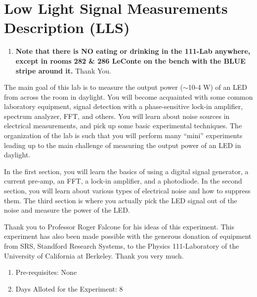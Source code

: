 \documentclass{../lab}
\begin{document}
\maketitle

\tableofcontents

\section{Low Light Signal Measurements Description (LLS)}

\begin{enumerate}
    \item \textbf{Note that there is NO eating or drinking in the 111-Lab anywhere, except in rooms 282 \& 286 LeConte on the bench with the BLUE stripe around it.} Thank You.

\end{enumerate}

The main goal of this lab is to measure the output power ($\sim$10-4 W) of an LED from across the room in daylight. You will become acquainted with some common laboratory equipment, signal detection with a phase-sensitive lock-in amplifier, spectrum analyzer, FFT, and others. You will learn about noise sources in electrical measurements, and pick up some basic experimental techniques. The organization of the lab is such that you will perform many ``mini'' experiments leading up to the main challenge of measuring the output power of an LED in daylight.

In the first section, you will learn the basics of using a digital signal generator, a current pre-amp, an FFT, a lock-in amplifier, and a photodiode. In the second section, you will learn about various types of electrical noise and how to suppress them. The third section is where you actually pick the LED signal out of the noise and measure the power of the LED.

Thank you to Professor Roger Falcone for his ideas of this experiment. This experiment has also been made possible with the generous donation of equipment from SRS, Standford Research Systems, to the Physics 111-Laboratory of the University of California at Berkeley. Thank you very much.

\begin{enumerate}
    \item Pre-requisites: None

    \item Days Alloted for the Experiment: 8

\end{enumerate}
\end{document}

